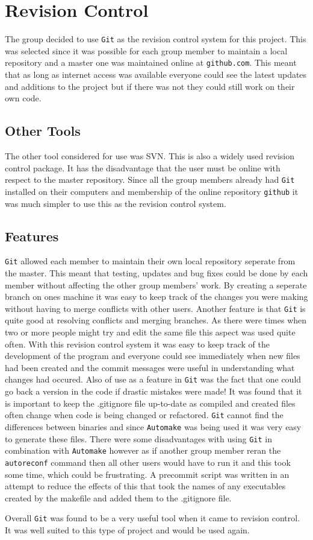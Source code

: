 \section{Revision Control}
The group decided to use \texttt{Git} as the revision control system for this project.
This was selected since it was possible for each group member to maintain a local repository and a master one was maintained online at \texttt{github.com}.
This meant that as long as internet access was available everyone could see the latest updates and additions to the project but if there was not they could still work on their own code.

\subsection{Other Tools}
The other tool considered for use was SVN.
This is also a widely used revision control package.
It has the disadvantage that the user must be online with respect to the master repository.
Since all the group members already had \texttt{Git} installed on their computers and membership of the online repository \texttt{github} it was much simpler to use this as the revision control system.

\subsection{Features}
\texttt{Git} allowed each member to maintain their own local repository seperate from the master.
This meant that testing, updates and bug fixes could be done by each member without affecting the other group members' work.
By creating a seperate branch on ones machine it was easy to keep track of the changes you were making without having to merge conflicts with other users.
Another feature is that \texttt{Git} is quite good at resolving conflicts and merging branches.
As there were times when two or more people might try and edit the same file this aspect was used quite often.
With this revision control system it was easy to keep track of the development of the program and everyone could see immediately when new files had been created and the commit messages were useful in understanding what changes had occured.
Also of use as a feature in \texttt{Git} was the fact that one could go back a version in the code if drastic mistakes were made!
It was found that it is important to keep the .gitignore file up-to-date as compiled and created files often change when code is being changed or refactored.
\texttt{Git} cannot find the differences between binaries and since \texttt{Automake} was being used it was very easy to generate these files.
There were some disadvantages with using \texttt{Git} in combination with \texttt{Automake} however as if another group member reran the \texttt{autoreconf} command then all other users would have to run it and this took some time, which could be frustrating.
A precommit script was written in an attempt to reduce the effects of this that took the names of any executables created by the makefile and added them to the .gitignore file.

Overall \texttt{Git} was found to be a very useful tool when it came to revision control.
It was well suited to this type of project and would be used again.
